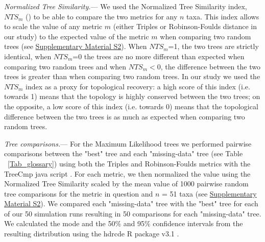 \documentclass[12pt,letterpaper]{article}
\renewcommand{\subsubsection}[1]{%
\vspace{2ex}
\noindent
\textit{#1.}---}
\begin{document}
\subsubsection{Normalized Tree Similarity}
We used the Normalized Tree Similarity index, $NTS_m$ (\citealp{Bogdanowicz2012}) to be able to compare the two metrics for any $n$ taxa.
This index allows to scale the value of any metric $m$ (either Triples or Robinson-Foulds distance in our study) to the expected value of the metric $m$ when comparing two random trees (see \hyperref[SupplementaryMaterial]{Supplementary Material S2}).
When $NTS_m$=1, the two trees are strictly identical, when $NTS_m$=0 the trees are no more different than expected when comparing two random trees and when $NTS_m$$<$0, the difference between the two trees is greater than when comparing two random trees.
In our study we used the $NTS_m$ index as a proxy for topological recovery: a high score of this index (i.e. towards 1) means that the topology is highly conserved between the two trees; on the opposite, a low score of this index (i.e. towards 0) means that the topological difference between the two trees is as much as expected when comparing two random trees.

\subsubsection{Tree comparisons}
For the Maximum Likelihood trees we performed pairwise comparisons between the "best" tree and each "missing-data" tree (see Table ~\ref{Tab_glossary}) using both the Triples and Robinson-Foulds metrics %
with the TreeCmp java script \citep{Bogdanowicz2012}.
For each metric, we then normalized the value using the Normalized Tree Similarity scaled by the mean value of 1000 pairwise random tree comparisons for the metric in question and $n$ = 51 taxa (see \hyperref[SupplementaryMaterial]{Supplementary Material S2}). %
We compared each "missing-data" tree with the "best" tree for each of our 50 simulation runs
resulting in 50 comparisons for each "missing-data" tree.
We calculated the mode and the 50\% and 95\% confidence intervals from the resulting distribution using the hdrcde R package v3.1 \citep{hdrcde}. %
\end{document}
